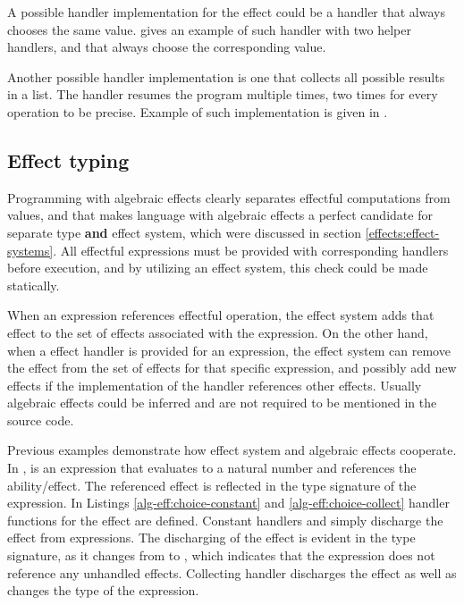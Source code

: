 

A possible handler implementation for the  effect could be a handler that always chooses the same  value.  gives an example of such handler with two helper handlers,  and  that always choose the corresponding value.



Another possible handler implementation is one that collects all possible results in a list.
The handler resumes the program multiple times, two times for every  operation to be precise. Example of such implementation is given in .




\subsection{Effect typing}
Programming with algebraic effects clearly separates effectful computations from values, and that makes language with algebraic effects a perfect candidate for separate type \textbf{and} effect system, which were discussed in section \ref{effects:effect-systems}. All effectful expressions must be provided with corresponding handlers before execution, and by utilizing an effect system, this check could be made statically. 

When an expression references effectful operation, the effect system adds that effect to the set of effects associated with the expression. On the other hand, when a effect handler is provided for an expression, the effect system can remove the effect from the set of effects for that specific expression, and possibly add new effects if the implementation of the handler references other effects. Usually algebraic effects could be inferred and are not required to be mentioned in the source code.

Previous examples demonstrate how effect system and algebraic effects cooperate. In ,  is an expression that evaluates to a natural number and references the  ability/effect. The referenced effect is reflected in the type signature of the expression. In Listings \ref{alg-eff:choice-constant} and \ref{alg-eff:choice-collect} handler functions for the  effect are defined. Constant handlers  and  simply discharge the effect from expressions. The discharging of the effect is evident in the type signature, as it changes from  to , which indicates that the expression does not reference any unhandled effects. Collecting handler  discharges the effect as well as changes the type of the expression.

